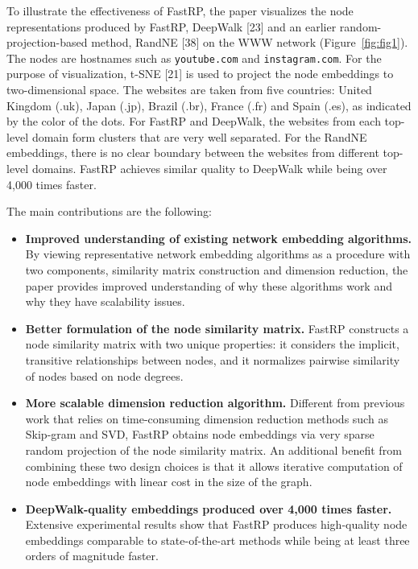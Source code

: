 \documentclass[11pt]{article}
\begin{document}
To illustrate the effectiveness of FastRP, the paper visualizes the node representations produced by FastRP, DeepWalk [23] and an earlier random-projection-based method, RandNE [38] on the WWW network (Figure~\ref{fig:fig1}). The nodes are hostnames such as \texttt{youtube.com} and \texttt{instagram.com}. For the purpose of visualization, t-SNE [21] is used to project the node embeddings to two-dimensional space. The websites are taken from five countries: United Kingdom (.uk), Japan (.jp), Brazil (.br), France (.fr) and Spain (.es), as indicated by the color of the dots. For FastRP and DeepWalk, the websites from each top-level domain form clusters that are very well separated. For the RandNE embeddings, there is no clear boundary between the websites from different top-level domains. FastRP achieves similar quality to DeepWalk while being over 4,000 times faster.

The main contributions are the following:
\begin{itemize}[leftmargin=1.5em]
    \item \textbf{Improved understanding of existing network embedding algorithms.} By viewing representative network embedding algorithms as a procedure with two components, similarity matrix construction and dimension reduction, the paper provides improved understanding of why these algorithms work and why they have scalability issues.
    \item \textbf{Better formulation of the node similarity matrix.} FastRP constructs a node similarity matrix with two unique properties: it considers the implicit, transitive relationships between nodes, and it normalizes pairwise similarity of nodes based on node degrees.
    \item \textbf{More scalable dimension reduction algorithm.} Different from previous work that relies on time-consuming dimension reduction methods such as Skip-gram and SVD, FastRP obtains node embeddings via very sparse random projection of the node similarity matrix. An additional benefit from combining these two design choices is that it allows iterative computation of node embeddings with linear cost in the size of the graph.
    \item \textbf{DeepWalk-quality embeddings produced over 4,000 times faster.} Extensive experimental results show that FastRP produces high-quality node embeddings comparable to state-of-the-art methods while being at least three orders of magnitude faster.
\end{itemize}
\end{document}
